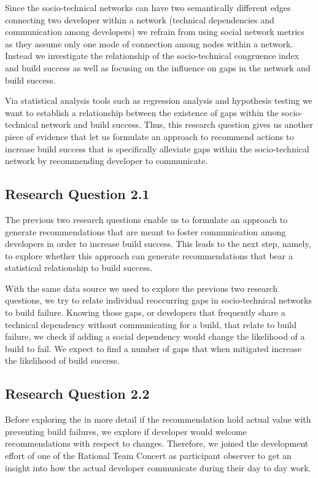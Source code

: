 Since the socio-technical networks can have two semantically different edges connecting two developer within a network (technical dependencies and communication among developers) we refrain from using social network metrics as they assume only one mode of connection among nodes within a network.
Instead we investigate the relationship of the socio-technical congruence index and build success as well as focusing on the influence on gaps in the network and build success.

Via statistical analysis tools such as regression analysis and hypothesis testing we want to establish a relationship between the existence of gaps within the socio-technical network and build success.
Thus, this research question gives us another piece of evidence that let us formulate an approach to recommend actions to increase build success that is specifically alleviate gaps within the socio-technical network by recommending developer to communicate.

\subsection{Research Question 2.1}
The previous two research questions enable us to formulate an approach to generate recommendations that are meant to foster communication among developers in order to increase build success.
This leads to the next step, namely, to explore whether this approach can generate recommendations that bear a statistical relationship to build success.

With the same data source we used to explore the previous two research questions, we try to relate individual reoccurring gaps in socio-technical networks to build failure.
Knowing those gaps, or developers that frequently share a technical dependency without communicating for a build, that relate to build failure, we check if adding a social dependency would change the likelihood of a build to fail.
We expect to find a number of gaps that when mitigated increase the likelihood of build success.

\subsection{Research Question 2.2}
Before exploring the in more detail if the recommendation hold actual value with preventing build failures, we explore if developer would welcome recommendations with respect to changes.
Therefore, we joined the development effort of one of the Rational Team Concert as participant observer to get an insight into how the actual developer communicate during their day to day work.

